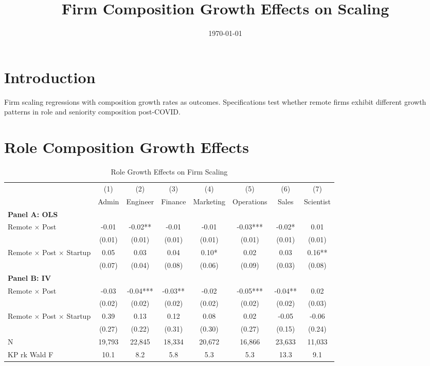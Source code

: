 \documentclass[11pt]{article}
\title{Firm Composition Growth Effects on Scaling}
\date{\today}
\begin{document}
\maketitle

\section{Introduction}

Firm scaling regressions with composition growth rates as outcomes. Specifications test whether remote firms exhibit different growth patterns in role and seniority composition post-COVID.

\section{Role Composition Growth Effects}

\begin{table}[H]
\centering
\caption{Role Growth Effects on Firm Scaling}
\begin{tabular}{lccccccc}
\toprule
 & (1) & (2) & (3) & (4) & (5) & (6) & (7) \\
 & Admin & Engineer & Finance & Marketing & Operations & Sales & Scientist \\
\midrule
\multicolumn{8}{l}{\textbf{Panel A: OLS}} \\
\addlinespace
Remote $\times$ Post & -0.01 & -0.02** & -0.01 & -0.01 & -0.03*** & -0.02* & 0.01 \\ & (0.01) & (0.01) & (0.01) & (0.01) & (0.01) & (0.01) & (0.01) \\
\addlinespace[0.5em]
Remote $\times$ Post $\times$ Startup & 0.05 & 0.03 & 0.04 & 0.10* & 0.02 & 0.03 & 0.16** \\ & (0.07) & (0.04) & (0.08) & (0.06) & (0.09) & (0.03) & (0.08) \\
\midrule
\multicolumn{8}{l}{\textbf{Panel B: IV}} \\
\addlinespace
Remote $\times$ Post & -0.03 & -0.04*** & -0.03** & -0.02 & -0.05*** & -0.04** & 0.02 \\ & (0.02) & (0.02) & (0.02) & (0.02) & (0.02) & (0.02) & (0.03) \\
\addlinespace[0.5em]
Remote $\times$ Post $\times$ Startup & 0.39 & 0.13 & 0.12 & 0.08 & 0.02 & -0.05 & -0.06 \\ & (0.27) & (0.22) & (0.31) & (0.30) & (0.27) & (0.15) & (0.24) \\
\midrule
N & 19,793 & 22,845 & 18,334 & 20,672 & 16,866 & 23,633 & 11,033 \\
KP rk Wald F & 10.1 & 8.2 & 5.8 & 5.3 & 5.3 & 13.3 & 9.1\\
\bottomrule
\end{tabular}
\end{table}
\end{document}
